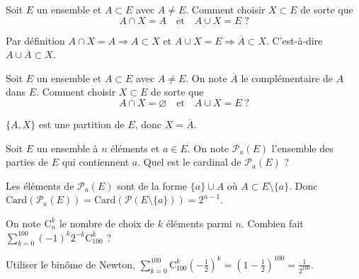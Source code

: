 \begin{question}
Soit $E$ un ensemble et $A\subset E$ avec $A\neq E$. Comment choisir $X\subset E$ de sorte que
$$A\cap X=A\quad \mbox{et}\quad A\cup X=E \; ?$$
\begin{answers}  
\end{answers}
\begin{explanations}
Par définition $A\cap X=A\Rightarrow A\subset X$ et $A\cup X=E\Rightarrow \overline{A}\subset X$. C'est-à-dire $A\cup \overline{A}\subset X$.
\end{explanations}
\end{question}



\begin{question}
Soit $E$ un ensemble et $A\subset E$ avec $A\neq E$. On note $\overline{A}$ le complémentaire de $A$ dans $E$. Comment choisir $X\subset E$ de sorte que
$$A\cap X=\varnothing \quad \mbox{et}\quad A\cup X=E \; ?$$
\begin{answers}  
\end{answers}
\begin{explanations}
$\{A,X\}$ est une partition de $E$, donc $X=\overline{A}$.
\end{explanations}
\end{question}



\begin{question}
Soit $E$ un ensemble à $n$ éléments et $a\in E$. On note $\mathscr{P}_a(E)$ l'ensemble des parties de $E$ qui contiennent $a$. Quel est le cardinal de $\mathscr{P}_a(E)$ ?
\begin{answers}  
\end{answers}
\begin{explanations}
Les éléments de $\mathscr{P}_a(E)$ sont de la forme $\{a\}\cup A$ où $A\subset E\setminus \{a\}$. Donc $\mathrm{Card}(\mathscr{P}_a(E))=\mathrm{Card}(\mathscr{P}(E\setminus \{a\}))=2^{n-1}$.
\end{explanations}
\end{question}


\begin{question}
On note $\mathrm{C}^k_n$ le nombre de choix de $k$ éléments parmi $n$. Combien fait $\displaystyle \sum _{k=0}^{100}(-1)^k2^{-k}\mathrm{C}^k_{100}$ ?
\begin{answers}  
\end{answers}
\begin{explanations}
Utiliser le binôme de Newton, $\displaystyle \sum _{k=0}^{100}\mathrm{C}^k_{100}\left(-\frac{1}{2}\right)^k=\left(1-\frac{1}{2}\right)^{100}=\frac{1}{2^{100}}$.
\end{explanations}
\end{question}



